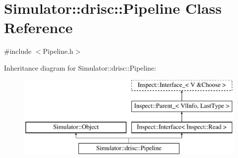 \hypertarget{class_simulator_1_1drisc_1_1_pipeline}{\section{Simulator\+:\+:drisc\+:\+:Pipeline Class Reference}
\label{class_simulator_1_1drisc_1_1_pipeline}
}


{\ttfamily \#include $<$Pipeline.\+h$>$}

Inheritance diagram for Simulator\+:\+:drisc\+:\+:Pipeline\+:\begin{figure}[H]
\begin{center}
\leavevmode
\includegraphics[height=4.000000cm]{class_simulator_1_1drisc_1_1_pipeline}
\end{center}
\end{figure}
